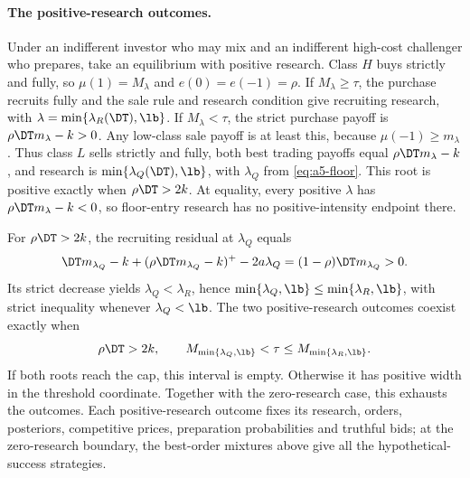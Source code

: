 \paragraph{The positive-research outcomes.}
Under an indifferent investor who may mix and an indifferent high-cost challenger who prepares, take an
equilibrium with positive research. Class \(H\) buys strictly and fully, so \(\mu(1)=M_\lambda\) and
\(e(0)=e(-1)=\rho\). If \(M_\lambda\ge\tau\), the purchase recruits fully and the sale rule and research
condition give recruiting research, with \(\lambda=\min\{\lambda_R(\DT),\lb\}\).
If \(M_\lambda<\tau\), the strict purchase payoff is \(\rho\DT m_\lambda-k>0\). Any low-class sale payoff is
at least this, because \(\mu(-1)\ge m_\lambda\). Thus class \(L\) sells strictly and fully, both best trading
payoffs equal \(\rho\DT m_\lambda-k\), and research is
\(\min\{\lambda_Q(\DT),\lb\}\), with \(\lambda_Q\) from \eqref{eq:a5-floor}.
This root is positive exactly when \(\rho\DT>2k\). At equality, every positive \(\lambda\) has
\(\rho\DT m_\lambda-k<0\), so floor-entry research has no positive-intensity endpoint there.

For \(\rho\DT>2k\), the recruiting residual at \(\lambda_Q\) equals
\[
 \DT m_{\lambda_Q}-k+(\rho\DT m_{\lambda_Q}-k)^+-2a\lambda_Q
 =(1-\rho)\DT m_{\lambda_Q}>0.
\]
Its strict decrease yields \(\lambda_Q<\lambda_R\), hence
\(\min\{\lambda_Q,\lb\}\le\min\{\lambda_R,\lb\}\), with strict inequality whenever \(\lambda_Q<\lb\).
The two positive-research outcomes coexist exactly when
\[
 \rho\DT>2k,\qquad
 M_{\min\{\lambda_Q,\lb\}}<\tau\le M_{\min\{\lambda_R,\lb\}}.
\]
If both roots reach the cap, this interval is empty. Otherwise it has positive width in the threshold
coordinate. Together with the zero-research case, this exhausts the outcomes. Each positive-research outcome
fixes its research, orders, posteriors, competitive prices, preparation probabilities and truthful bids;
at the zero-research boundary, the best-order mixtures above give all the hypothetical-success strategies.
